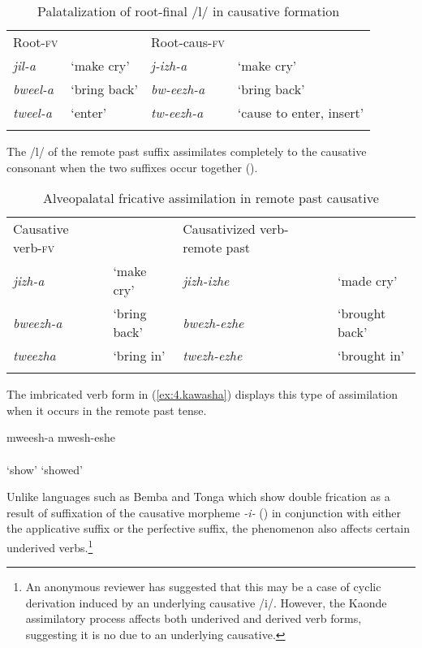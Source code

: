 \documentclass[output=paper]{langsci/langscibook}
\begin{document}
\begin{table}
\begin{tabular}{llll}
\lsptoprule
  Root-\textsc{fv} &  &   Root-caus-\textsc{fv} & \\
\textit{jil-a} & `make cry' & \textit{j-izh-a} & `make cry' \\
\textit{bweel-a} & `bring back' & \textit{bw-eezh-a} & `bring back' \\
\textit{tweel-a} & `enter' & \textit{tw-eezh-a} & `cause to enter, insert' \\

\lspbottomrule
\end{tabular}

\caption{Palatalization of root-final /l/ in causative formation}
\label{tab:6.kawasha}

 \end{table}


The /l/ of the remote past suffix assimilates completely to the causative consonant when the two suffixes occur together ().


\begin{table}
\begin{tabular}{llll}
\lsptoprule
Causative verb-\textsc{fv} &  & Causativized verb-remote past & \\
\textit{jizh-a} & `make cry' & \textit{jizh-izhe} & `made cry' \\
\textit{bweezh-a} & `bring back' & \textit{bwezh-ezhe} & `brought back' \\
\textit{tweezha} & `bring in' & \textit{twezh-ezhe} & `brought in' \\

\lspbottomrule
\end{tabular}

\caption{Alveopalatal fricative assimilation in remote past causative}
\label{tab:7.kawasha}

 \end{table}


The imbricated verb form in (\ref{ex:4.kawasha}) displays this type of assimilation when it occurs in the remote past tense. 


\ea
\label{ex:4.kawasha}
\gll mweesh-a mwesh-eshe \\
	\\
\glt ‘show’ ‘showed’
\z


Unlike languages such as Bemba and Tonga which show double frication as a result of suffixation of the causative morpheme \textit{-i-} (\citealt{hyman1995,hyman2003}) in conjunction with either the applicative suffix or the perfective suffix, the phenomenon also affects certain underived verbs.\footnote{An anonymous reviewer has suggested that this may be a case of cyclic derivation induced by an underlying causative /i/. However, the Kaonde assimilatory process affects both underived and derived verb forms, suggesting it is no due to an underlying causative.}
\end{document}
